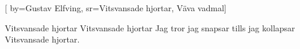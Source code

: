 [
	by={Gustav Elfving},					
	sr={Vitsvansade hjortar, Väva vadmal}]					
	
\beginverse*
Vitsvansade hjortar
Vitsvansade hjortar
Jag tror jag snapsar 
tills jag kollapsar
Vitsvansade hjortar.
\endverse									
\endsong							
